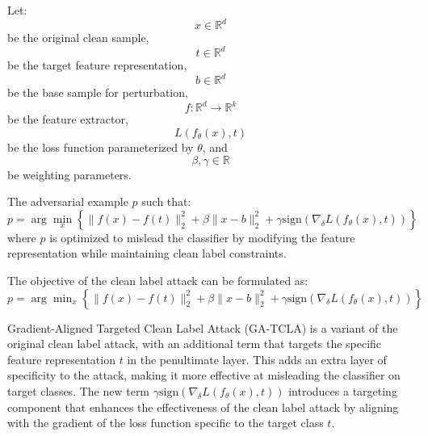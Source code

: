Let:  
\[
x \in \mathbb{R}^d
\]
be the original clean sample,  
\[
t \in \mathbb{R}^d
\]
be the target feature representation,  
\[
b \in \mathbb{R}^d
\]
be the base sample for perturbation,  
\[
f: \mathbb{R}^d \to \mathbb{R}^k
\]
be the feature extractor,  
\[
L(f_\theta(x), t)
\]
be the loss function parameterized by \(\theta\),  
and  
\[
\beta, \gamma \in \mathbb{R}
\]
be weighting parameters.  

The adversarial example \( p \) such that:  
\[
p = \arg\min_x \left\{ \|f(x) - f(t)\|_2^2 + \beta \|x - b\|_2^2 + \gamma \text{sign}(\nabla_\delta L(f_\theta(x), t)) \right\}
\]
where \( p \) is optimized to mislead the classifier by modifying the feature representation while maintaining clean label constraints.



The objective of the clean label attack can be formulated as:
$p = \arg\min_x \left\{ \|f(x) - f(t)\|_2^2 + \beta \|x - b\|_2^2 + \gamma \text{sign}(\nabla_\delta L(f_\theta(x), t)) \right\}$

Gradient-Aligned Targeted Clean Label Attack (GA-TCLA) is a variant of the original clean label attack, with an additional term that targets the specific feature representation $t$ in the penultimate layer. This adds an extra layer of specificity to the attack, making it more effective at misleading the classifier on target classes. The new term $\gamma \text{sign}(\nabla_\delta L(f_\theta(x), t))$ introduces a targeting component that enhances the effectiveness of the clean label attack by aligning with the gradient of the loss function specific to the target class $t$.